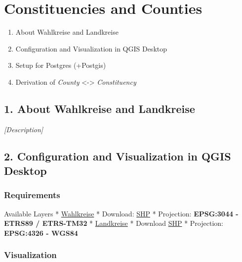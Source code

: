 
\section{Constituencies and Counties}

\begin{enumerate}
\def\labelenumi{\arabic{enumi}.}
\itemsep1pt\parskip0pt
\item
  About Wahlkreise and Landkreise
\item
  Configuration and Visualization in QGIS Desktop
\item
  Setup for Postgres (+Postgis)
\item
  Derivation of \emph{County} \textless{}-\textgreater{}
  \emph{Constituency}
\end{enumerate}

\subsection{1. About Wahlkreise and
Landkreise}\label{about-wahlkreise-and-landkreise}

\emph{{[}Description{]}}

\subsection{2. Configuration and Visualization in QGIS
Desktop}\label{configuration-and-visualization-in-qgis-desktop}

\subsubsection{Requirements}\label{requirements}

Available Layers *
\href{http://www.bundeswahlleiter.de/en/bundestagswahlen/BTW_BUND_13/wahlkreiseinteilung/kartographische_darstellung.html}{Wahlkreise}
* Download:
\href{http://www.bundeswahlleiter.de/de/bundestagswahlen/BTW_BUND_13/wahlkreiseinteilung/wahlkreisgeometrie/Geometrie_Wahlkreise_18DBT_VG1000_ETRS89.zip}{SHP}
* Projection: \textbf{EPSG:3044 - ETRS89 / ETRS-TM32} *
\href{http://www.gadm.org/country}{Landkreise} * Download
\href{http://biogeo.ucdavis.edu/data/gadm2/shp/DEU_adm.zip}{SHP} *
Projection: \textbf{EPSG:4326 - WGS84}

\subsubsection{Visualization}\label{visualization}

